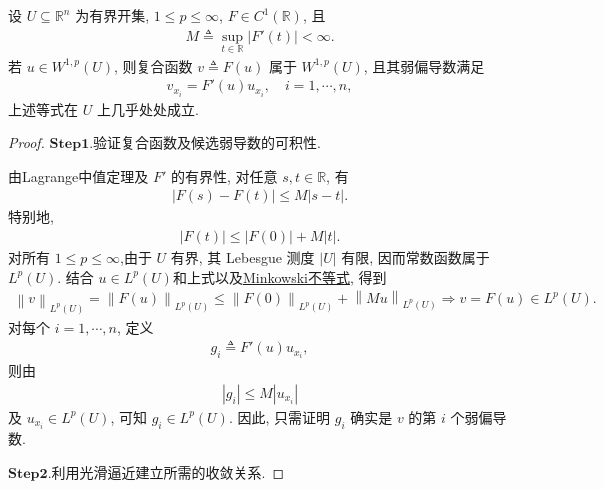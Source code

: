 \documentclass[../../main.tex]{subfiles}
\begin{document}
\begin{proposition}[一阶弱导数链式法则]\label{proposition:一阶弱导数链式法则}
设 $U\subseteq\mathbb{R}^{n}$ 为有界开集, $1\leqslant p\leqslant\infty$, $F\in C^{1}(\mathbb{R})$, 且
\begin{align*}
M\triangleq\sup\limits_{t\in\mathbb{R}}|F'(t)|<\infty.
\end{align*}
若 $u\in W^{1,p}(U)$, 则复合函数 $v\triangleq F(u)$ 属于 $W^{1,p}(U)$, 且其弱偏导数满足
\begin{align*}
v_{x_i}=F'(u)u_{x_i},\quad i=1,\cdots,n,
\end{align*}
上述等式在 $U$ 上几乎处处成立.
\end{proposition}
\begin{proof}
\noindent$\mathbf{Step}\bm{1}.${\heiti 验证复合函数及候选弱导数的可积性.}

由Lagrange中值定理及 $F'$ 的有界性, 对任意 $s,t\in\mathbb{R}$, 有
\begin{align}\label{eqJIOJFIOIWIOURIOWORWPPPPPnksksjsjsiohhssijsijsiixxx}
|F(s)-F(t)|\leqslant M|s-t|.
\end{align}
特别地,
\begin{align*}
|F(t)|\leqslant |F(0)|+M|t|.
\end{align*}
对所有 $1\leqslant p\leqslant\infty$,由于 $U$ 有界, 其 Lebesgue 测度 $|U|$ 有限, 因而常数函数属于 $L^{p}(U)$. 结合 $u\in L^{p}(U)$和上式以及\hyperref[Real Analysis-theorem:实变函数--Minkowski不等式]{Minkowski不等式}, 得到
\begin{align*}
\left\| v \right\| _{L^p\left( U \right)}=\left\| F\left( u \right) \right\| _{L^p\left( U \right)}\leqslant \left\| F\left( 0 \right) \right\| _{L^p\left( U \right)}+\left\| Mu \right\| _{L^p\left( U \right)}\Longrightarrow v=F\left( u \right) \in L^p\left( U \right) .
\end{align*}
对每个 $i=1,\cdots,n$, 定义
\begin{align*}
g_i\triangleq F'(u)u_{x_i},
\end{align*}
则由
\begin{align*}
|g_i|\leqslant M|u_{x_i}|
\end{align*}
及 $u_{x_i}\in L^{p}(U)$, 可知 $g_i\in L^{p}(U)$. 因此, 只需证明 $g_i$ 确实是 $v$ 的第 $i$ 个弱偏导数.

\noindent$\mathbf{Step}\bm{2}.${\heiti 利用光滑逼近建立所需的收敛关系.}


\end{proof}
\end{document}
